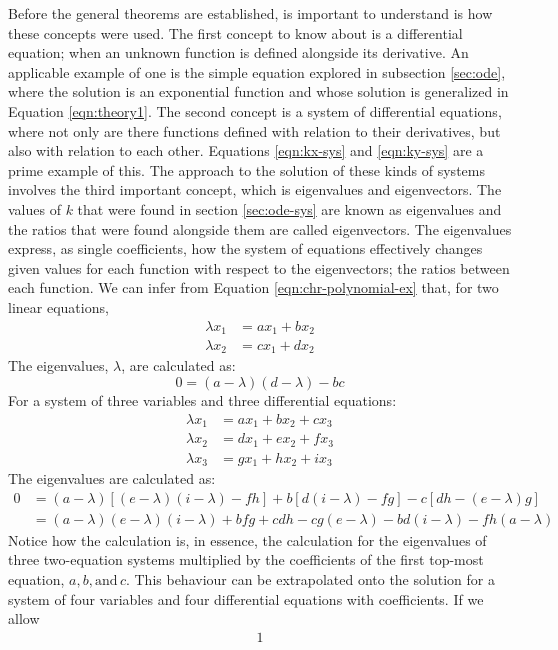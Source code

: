 \documentclass[12pt]{article}
\begin{document}
	Before the general theorems are established, is important to understand is how these concepts were used.
	The first concept to know about is a differential equation; when an unknown function is defined alongside its derivative.
	An applicable example of one is the simple equation explored in subsection \ref{sec:ode}, where the solution is an exponential function and whose solution is generalized in Equation \eqref{eqn:theory1}.
	The second concept is a system of differential equations, where not only are there functions defined with relation to their derivatives, but also with relation to each other.
	Equations \eqref{eqn:kx-sys} and \eqref{eqn:ky-sys} are a prime example of this.
	The approach to the solution of these kinds of systems involves the third important concept, which is eigenvalues and eigenvectors.
	The values of $k$ that were found in section \ref{sec:ode-sys} are known as eigenvalues and the ratios that were found alongside them are called eigenvectors.
	The eigenvalues express, as single coefficients, how the system of equations effectively changes given values for each function with respect to the eigenvectors; the ratios between each function.
	We can infer from Equation \eqref{eqn:chr-polynomial-ex} that, for two linear equations,
	\begin{align*}
		\lambda x_1 &= ax_1 + bx_2 \\
		\lambda x_2 &= cx_1 + dx_2
	\end{align*}
	The eigenvalues, $\lambda$, are calculated as:
	\begin{equation}
		0 = (a - \lambda)(d - \lambda) - bc
	\end{equation}
	For a system of three variables and three differential equations:
	\begin{align*}
		\lambda x_1 &= ax_1 + bx_2 + cx_3 \\
		\lambda x_2 &= dx_1 + ex_2 + fx_3 \\
		\lambda x_3 &= gx_1 + hx_2 + ix_3
	\end{align*}
	The eigenvalues are calculated as:
	\begin{align}
		0 &= (a - \lambda)[(e - \lambda)(i - \lambda) - fh] + b[d(i - \lambda) - fg] - c[dh - (e - \lambda)g] \\
		&= (a - \lambda)(e - \lambda)(i - \lambda) + bfg + cdh - cg(e - \lambda) - bd(i - \lambda) - fh(a - \lambda)
	\end{align}
	Notice how the calculation is, in essence, the calculation for the eigenvalues of three two-equation systems multiplied by the coefficients of the first top-most equation, $a, b, \text{and}\, c$.
	This behaviour can be extrapolated onto the solution for a system of four variables and four differential equations with coefficients.
	If we allow 
	\begin{multline*}
		1
	\end{multline*}
	
\end{document}
